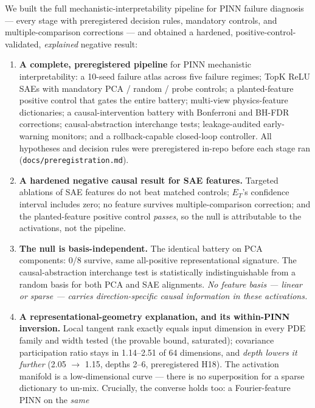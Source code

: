 \documentclass{article}
\newcommand{\ET}{E_T}
\begin{document}
We built the full mechanistic-interpretability pipeline for PINN failure
diagnosis --- every stage with preregistered decision rules, mandatory
controls, and multiple-comparison corrections --- and obtained a hardened,
positive-control-validated, \emph{explained} negative result:
\begin{enumerate}
  \item \textbf{A complete, preregistered pipeline} for PINN
        mechanistic interpretability: a 10-seed failure atlas across five
        failure regimes; TopK ReLU SAEs with mandatory PCA / random /
        probe controls; a planted-feature positive control that gates the
        entire battery; multi-view physics-feature dictionaries; a
        causal-intervention battery with Bonferroni and BH-FDR corrections;
        causal-abstraction interchange tests; leakage-audited
        early-warning monitors; and a rollback-capable closed-loop
        controller. All hypotheses and decision rules were preregistered
        in-repo before each stage ran (\texttt{docs/preregistration.md}).
  \item \textbf{A hardened negative causal result for SAE features.}
        Targeted ablations of SAE features do not beat matched controls;
        $\ET$'s confidence interval includes zero; no feature survives
        multiple-comparison correction; and the planted-feature positive
        control \emph{passes}, so the null is attributable to the
        activations, not the pipeline.
  \item \textbf{The null is basis-independent.} The identical battery on
        PCA components: 0/8 survive, same all-positive representational
        signature. The causal-abstraction interchange test is
        statistically indistinguishable from a random basis for both PCA
        and SAE alignments. \emph{No feature basis --- linear or sparse ---
        carries direction-specific causal information in these
        activations.}
  \item \textbf{A representational-geometry explanation, and its
        within-PINN inversion.} Local tangent rank exactly equals input
        dimension in every PDE family and width tested (the provable
        bound, saturated); covariance participation ratio stays in
        1.14--2.51 of 64 dimensions, and \emph{depth lowers it further}
        (2.05 $\to$ 1.15, depths 2--6, preregistered H18). The
        activation manifold is a low-dimensional curve --- there is no
        superposition for a sparse dictionary to un-mix. Crucially, the
        converse holds too: a Fourier-feature PINN on the \emph{same
}
\end{enumerate}
\end{document}
